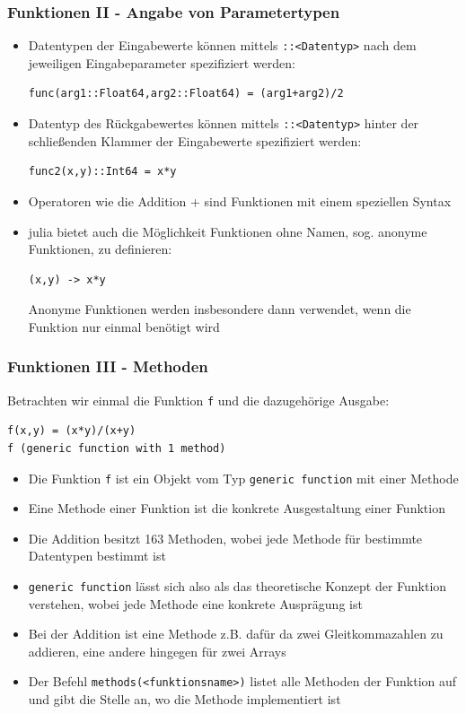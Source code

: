 \begin{frame}[fragile]
\frametitle{Funktionen II - Angabe von Parametertypen}
\begin{itemize}[<+->]
\item Datentypen der Eingabewerte können mittels \verb+::<Datentyp>+ nach dem jeweiligen Eingabeparameter spezifiziert werden:
\begin{verbatim}
func(arg1::Float64,arg2::Float64) = (arg1+arg2)/2
\end{verbatim}
\item Datentyp des Rückgabewertes können mittels \verb+::<Datentyp>+ hinter der schließenden Klammer der Eingabewerte spezifiziert werden:
\begin{verbatim}
func2(x,y)::Int64 = x*y
\end{verbatim}
\item Operatoren wie die Addition + sind Funktionen mit einem speziellen Syntax
\item julia bietet auch die Möglichkeit Funktionen ohne Namen, sog. anonyme Funktionen, zu definieren:
\begin{verbatim}
(x,y) -> x*y
\end{verbatim}
Anonyme Funktionen werden insbesondere dann verwendet, wenn die Funktion nur einmal benötigt wird
\end{itemize}
\end{frame}
\begin{frame}[fragile]
\frametitle{Funktionen III - Methoden}
Betrachten wir einmal die Funktion \verb+f+ und die dazugehörige Ausgabe:
\begin{verbatim}
f(x,y) = (x*y)/(x+y)
f (generic function with 1 method)
\end{verbatim}
\begin{itemize}[<+->]
\item Die Funktion \verb+f+ ist ein Objekt vom Typ \verb+generic function+ mit einer Methode
\item Eine Methode einer Funktion ist die konkrete Ausgestaltung einer Funktion
\item Die Addition besitzt 163 Methoden, wobei jede Methode für bestimmte Datentypen bestimmt ist
\item \verb+generic function+ lässt sich also als das theoretische Konzept der Funktion verstehen, wobei jede Methode eine konkrete Ausprägung ist
\item Bei der Addition ist eine Methode z.B. dafür da zwei Gleitkommazahlen zu addieren, eine andere hingegen für zwei Arrays
\item Der Befehl \verb+methods(<funktionsname>)+ listet alle Methoden der Funktion auf und gibt die Stelle an, wo die Methode implementiert ist
\end{itemize}
\end{frame}
